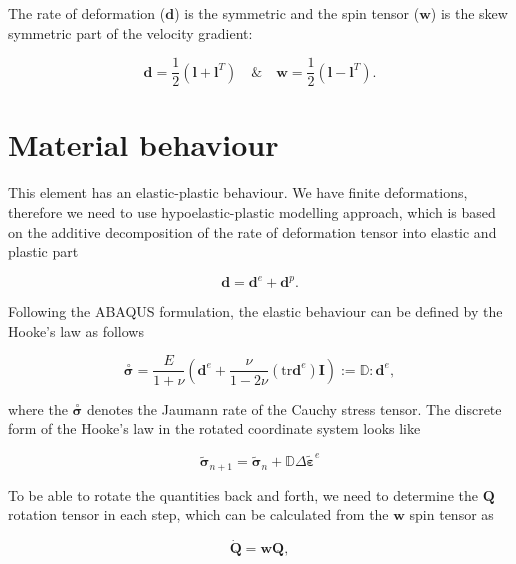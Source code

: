\documentclass[12pt,a4paper]{article}
\begin{document}
The rate of deformation ($\boldsymbol{d}$) is the symmetric and the spin tensor ($\boldsymbol{w}$) is the skew symmetric part of the velocity gradient:

\begin{equation}
    \boldsymbol{d} = \frac{1}{2}(\boldsymbol{l}+\boldsymbol{l}^T) \quad\&\quad \boldsymbol{w} = \frac{1}{2}(\boldsymbol{l}-\boldsymbol{l}^T).
\end{equation}  

\section*{Material behaviour}

This element has an elastic-plastic behaviour. We have finite deformations, therefore we need to use hypoelastic-plastic modelling approach, which is based on the additive decomposition of the rate of deformation tensor into elastic and plastic part

\begin{equation}
    \boldsymbol{d} = \boldsymbol{d}^e + \boldsymbol{d}^p.
\end{equation}  

Following the ABAQUS formulation, the elastic behaviour can be defined by the Hooke's law as follows

\begin{equation}
    \overset{\circ}{\boldsymbol{\sigma}}  = \frac{E}{1+\nu}\left(\boldsymbol{d}^e+\frac{\nu}{1-2\nu}(\text{tr}\boldsymbol{d}^e)\boldsymbol{I}\right) := \mathbb{D} : \boldsymbol{d}^e,
\end{equation}

where the $\overset{\circ}{\boldsymbol{\sigma}}$ denotes the Jaumann rate of the Cauchy stress tensor. The discrete form of the Hooke's law in the rotated coordinate system looks like 

\begin{equation}
    \tilde{\boldsymbol{\sigma}}_{n+1}  = \tilde{\boldsymbol{\sigma}}_{n} + 
    \mathbb{D} \Delta\tilde{\boldsymbol{\varepsilon}}^e
\end{equation}

To be able to rotate the quantities back and forth, we need to determine the $\boldsymbol{Q}$ rotation tensor in each step, which can be calculated from the $\boldsymbol{w}$ spin tensor as

\begin{equation}
    \dot{\boldsymbol{Q}} = \boldsymbol{w}\boldsymbol{Q},
\end{equation}
\end{document}
